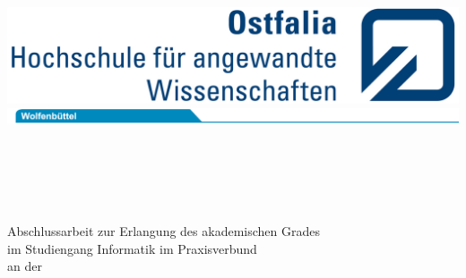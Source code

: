 % 
%
\begin{titlepage}
	\vspace*{-3.0cm}
	\hspace*{ 6.90cm}\includegraphics[scale=0.93]{../ostfalia/Ostfalia_LS_RGB_klein.jpg}\\
	\hspace*{-1.00cm}\includegraphics[scale=1.20]{../ostfalia/Reiter_Wolfen_RGB_174mm.jpg}\\
	
	\\
	
	\hrulefill\\
	
	\noindent{\Large\textsf{\studenteins, \matrNumbereins\\}}
	
	
	\vspace{2em}
	\textbf{
	\textsf{\huge\titel \\[0.3ex]}}
	\textsf{\hspace*{0.5cm}\large \subtitel \\[0.05cm]}
	
	\vspace{2em}
	\begin{center}
	\ifdefined\graduation%
	\if\graduation\empty%
	\else%
	\textsf{Abschlussarbeit zur Erlangung des akademischen Grades}\\[0.5cm]
	\textsf{\graduation} \textsf{im Studiengang Informatik im Praxisverbund}\\[0.5cm]
	\textsf{an der \institution}\\[0.5cm]
	\textsf{\subinstitution}
	\fi
	\end{center}
	

\end{titlepage}
